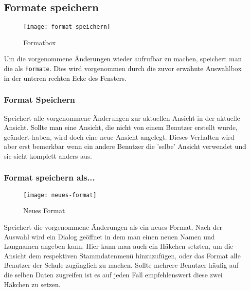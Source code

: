 \subsection{Formate speichern}

\begin{wrapfigure}{r}{.4\textwidth}
	\vspace{-14pt}
	\centering
	\texttt{[image: format-speichern]}
	\vspace{-5pt}
	\caption{Formatbox}
	\label{fig:format-speichern}
	\vspace{-35pt}
\end{wrapfigure}

Um die vorgenommene Änderungen wieder aufrufbar zu machen, speichert man die als \texttt{Formate}. Dies wird vorgenommen durch die zuvor erwähnte Auswahlbox in der unteren rechten Ecke des Fensters.

\subsubsection{Format Speichern}

Speichert alle vorgenommene Änderungen zur aktuellen Ansicht in der aktuelle Ansicht. Sollte man eine Ansicht, die nicht von einem Benutzer erstellt wurde, geändert haben, wird doch eine neue Ansicht angelegt. Dieses Verhalten wird aber erst bemerkbar wenn ein andere Benutzer die 'selbe' Ansicht verwendet und sie sieht komplett anders aus.

\subsubsection{Format speichern als...}

\begin{wrapfigure}{r}{.4\textwidth}
	\vspace{-14pt}
	\centering
	\texttt{[image: neues-format]}
	\vspace{-5pt}
	\caption{Neues Format}
	\label{fig:neues-format}
	\vspace{-15pt}
\end{wrapfigure}

Speichert die vorgenommene Änderungen als ein neues Format. Nach der Auswahl wird ein Dialog geöffnet in dem man einen neuen Namen und Langnamen angeben kann. Hier kann man auch ein Häkchen setzten, um die Ansicht dem respektiven Stammdatenmenü hinzuzufügen, oder das Format alle Benutzer der Schule zugänglich zu machen. Sollte mehrere Benutzer häufig auf die selben Daten zugreifen ist es auf jeden Fall empfehlenswert diese zwei Häkchen zu setzen.

